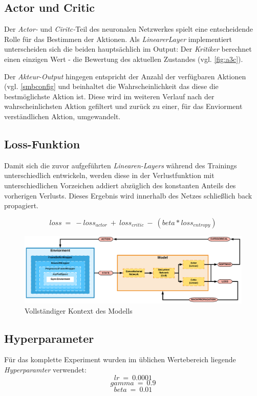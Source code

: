 \documentclass[sigconf,nonacm]{acmart}
\begin{document}
\subsection{Actor und Critic}
Der \textit{Actor-} und \textit{Ciritc-}Teil des neuronalen Netzwerkes spielt eine entscheidende Rolle für das Bestimmen der Aktionen. Als \textit{LinearerLayer} implementiert unterscheiden sich die beiden hauptsächlich im Output: Der \textit{Kritiker} berechnet einen einzigen Wert - die Bewertung des aktuellen Zustandes (vgl. \ref{fig:a3c}).

Der \textit{Akteur-Output} hingegen entspricht der Anzahl der verfügbaren Aktionen (vgl. \ref{smbconfig} und beinhaltet die Wahrscheinlichkeit das diese die bestmöglichste Aktion ist. Diese wird im weiteren Verlauf nach der wahrscheinlichsten Aktion gefiltert und zurück zu einer, für das Enviorment verständlichen Aktion, umgewandelt.

\subsection{Loss-Funktion}
Damit sich die zuvor aufgeführten \textit{Linearen-Layers} während des Trainings unterschiedlich entwickeln, werden diese in der Verlustfunktion mit unterschiedlichen Vorzeichen addiert abzüglich des konstanten Anteils des vorherigen Verlusts. Dieses Ergebnis wird innerhalb des Netzes schließlich back propagiert.

\begin{equation}
loss\ =\ -loss_{actor}\ +\ loss_{critic}\ -\ (beta * loss_{entropy})
\end{equation}

\begin{figure}[hbt!]
\includegraphics[angle=90,scale=0.11]{images/Basis_Architektur_c.png}
\caption{Vollständiger Kontext des Modells}
\label{fig:KontextModel}
\end{figure}

\subsection{Hyperparameter}
Für das komplette Experiment wurden im üblichen Wertebereich liegende \textit{Hyperparamter} verwendet:
\begin{equation}
lr\ =\ 0.0001
\end{equation}
\begin{equation}
gamma\ =\ 0.9
\end{equation}
\begin{equation}
beta\ =\ 0.01
\end{equation}
\end{document}
